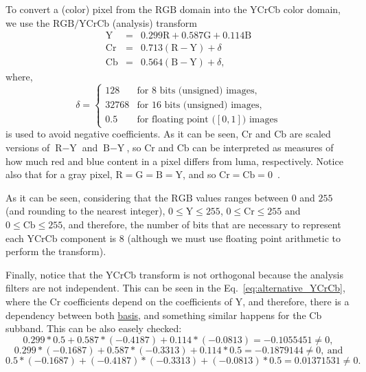 To convert a (color) pixel from the $\text{RGB}$ domain into the
\href{https://en.wikipedia.org/wiki/YCbCr}{$\text{YCrCb}$} color
domain, we use the $\text{RGB/YCrCb}$ (analysis)
transform~\cite{malvar2008lifting}
\begin{equation}
  \begin{array}{lcl}
    \text{Y}  & = & 0.299\text{R} + 0.587\text{G} + 0.114\text{B} \\
    \text{Cr} & = & 0.713(\text{R} - \text{Y}) + \delta \\
    \text{Cb} & = & 0.564(\text{B} - \text{Y}) + \delta,
  \end{array}
  \label{eq:alternative_YCrCb}
\end{equation}
where,
\begin{equation}
  \delta = \left\{
  \begin{array}{ll}
    128 & \text{for 8 bits (unsigned) images},\\
    32768 & \text{for 16 bits (unsigned) images},\\
    0.5 & \text{for floating point (}[0,1]\text{) images}
  \end{array}
  \right.
\end{equation}
is used to avoid negative coefficients. As it can be seen, $\text{Cr}$
and $\text{Cb}$ are scaled versions of $\text{R} - \text{Y}$ and
$\text{B} - \text{Y}$, so $\text{Cr}$ and $\text{Cb}$ can be
interpreted as measures of how much red and blue content in a pixel
differs from luma, respectively. Notice also that for a gray pixel,
$\text{R}=\text{G}=\text{B}=\text{Y}$, and so
$\text{Cr}=\text{Cb}=0$~\cite{malvar2008lifting}.

As it can be seen, considering that the $\text{RGB}$ values ranges
between $0$ and $255$ (and rounding to the nearest integer),
$0\le\text{Y}\le 255$, $0\le\text{Cr}\le 255$ and
$0\le\text{Cb}\le 255$, and therefore, the number of bits that are
necessary to represent each $\text{YCrCb}$ component is 8 (although we
must use floating point arithmetic to perform the transform).

Finally, notice that the $\text{YCrCb}$ transform is not orthogonal
because the analysis filters are not independent. This can be seen in
the Eq.~\ref{eq:alternative_YCrCb}, where the $\text{Cr}$ coefficients
depend on the coefficients of $\text{Y}$, and therefore, there is a
dependency between both
\href{https://en.wikipedia.org/wiki/Basis_(linear_algebra)}{basis},
and something similar happens for the $\text{Cb}$ subband. This can
be also easely checked: $$0.299*0.5 + 0.587*(-0.4187) +
0.114*(-0.0813) = -0.1055451 \neq 0,$$ $$0.299*(-0.1687) +
0.587*(-0.3313) + 0.114*0.5 = -0.1879144 \neq
0,~\mathrm{and}$$ $$0.5*(-0.1687) + (-0.4187)*(-0.3313 ) +
(-0.0813)*0.5 = 0.01371531 \neq 0.$$

